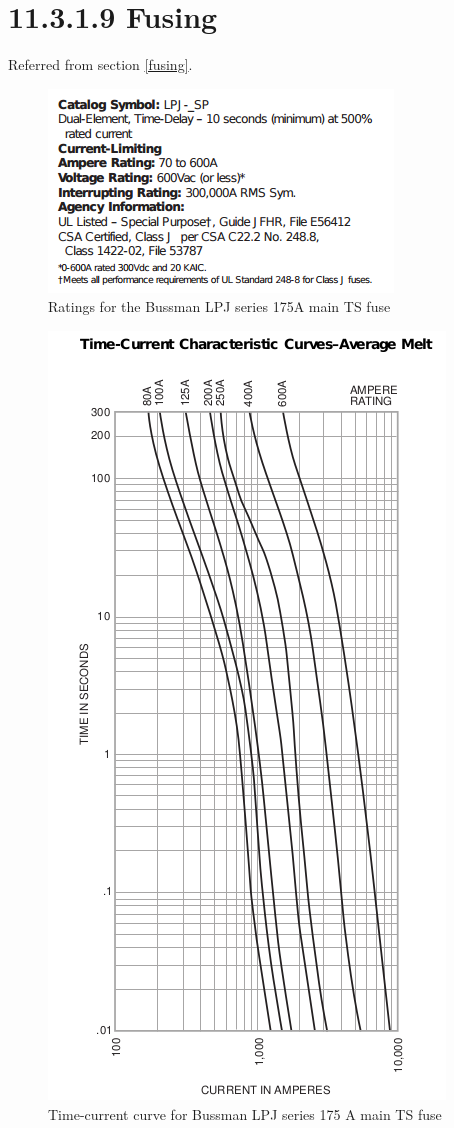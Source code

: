 \documentclass{article}
\begin{document}
{\section*{11.3.1.9 Fusing} \label{fusingappendix}

Referred from section \ref{fusing}.

\begin{figure}[H]
    \centering
    \includegraphics{TSmainratings}
    \caption{Ratings for the Bussman LPJ series 175A main TS fuse}
    \label{mainTSfuseratings}
\end{figure}

\begin{figure}[H]
    \centering
    \includegraphics[width = 0.7 \textwidth]{TSfuseT-Agraph}
    \caption{Time-current curve for Bussman LPJ series 175 A main TS fuse}
    \label{mainTSfusecurve}
\end{figure}

}
\end{document}
